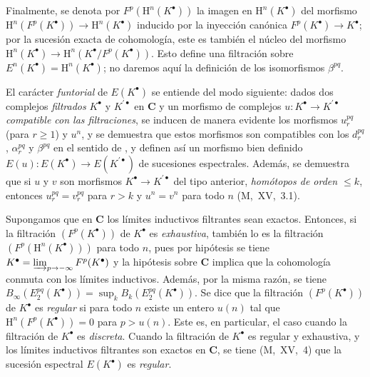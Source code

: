 \begin{env}[11.2.2]
Finalmente, se denota por $F^p(\mathrm H^n(K^\bullet))$ la imagen en $\mathrm H^n(K^\bullet)$ del morfismo $\mathrm H^n(F^p(K^\bullet))\to\mathrm H^n(K^\bullet)$ inducido por la inyección canónica $F^p(K^\bullet)\to K^\bullet$; por la sucesión exacta de cohomología, este es también el núcleo del morfismo $\mathrm H^n(K^\bullet)\to\mathrm H^n(K^\bullet/F^p(K^\bullet))$.
Esto define una filtración sobre $E^n(K^\bullet)=\mathrm H^n(K^\bullet)$; no daremos aquí la definición de los isomorfismos $\beta^{pq}$.
\end{env}

\begin{env}[11.2.3]
\label{0.11.2.3}
\label{0.11.2.3-fr}
El carácter \emph{funtorial} de $E(K^\bullet)$ se entiende del modo siguiente: dados dos complejos \emph{filtrados} $K^\bullet$ y $K^{\prime\bullet}$ en $\boldsymbol{C}$ y un morfismo de complejos $u:K^\bullet\to K^{\prime\bullet}$ \emph{compatible con las filtraciones}, se inducen de manera evidente los morfismos $u_r^{pq}$ (para $r\geq1$) y $u^n$, y se demuestra que estos morfismos son compatibles con los $d_r^{pq}$, $\alpha_r^{pq}$ y $\beta^{pq}$ en el sentido de , y definen así un morfismo bien definido $E(u):E(K^\bullet)\to E(K^{\prime\bullet})$ de sucesiones espectrales.
Además, se demuestra que si $u$ y $v$ son morfismos $K^\bullet\to K^{\prime\bullet}$ del tipo anterior, \emph{homótopos de orden $\leq k$}, entonces $u_r^{pq}=v_r^{pq}$ para $r>k$ y $u^n=v^n$ para todo $n$ (M,~XV,~3.1).
\end{env}

\begin{env}[11.2.4]
\label{0.11.2.4-fr}
Supongamos que en $\boldsymbol{C}$ los límites inductivos filtrantes sean exactos. Entonces, si la filtración $(F^p(K^\bullet))$ de $K^\bullet$ es \emph{exhaustiva}, también lo es la filtración $(F^p(\mathrm H^n(K^\bullet)))$ para todo $n$, pues por hipótesis se tiene $K^\bullet=\varinjlim_{p\to-\infty}F^p(K^\bullet)$ y la hipótesis sobre $\boldsymbol{C}$ implica que la cohomología conmuta con los límites inductivos.
Además, por la misma razón, se tiene $B_\infty(E_2^{pq}(K^\bullet))=\sup_k B_k(E_2^{pq}(K^\bullet))$.
Se dice que la filtración $(F^p(K^\bullet))$ de $K^\bullet$ es \emph{regular} si para todo $n$ existe un entero $u(n)$ tal que $\mathrm H^n(F^p(K^\bullet))=0$ para $p>u(n)$.
Este es, en particular, el caso cuando la filtración de $K^\bullet$ es \emph{discreta}.
Cuando la filtración de $K^\bullet$ es regular y exhaustiva, y los límites inductivos filtrantes son exactos en $\boldsymbol{C}$, se tiene (M,~XV,~4) que la sucesión espectral $E(K^\bullet)$ es \emph{regular}.
\end{env}

